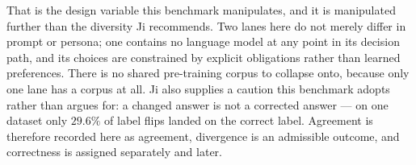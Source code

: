 That is the design variable this benchmark manipulates, and it is manipulated further than the diversity Ji recommends. Two lanes here do not merely differ in prompt or persona; one contains no language model at any point in its decision path, and its choices are constrained by explicit obligations rather than learned preferences. There is no shared pre-training corpus to collapse onto, because only one lane has a corpus at all. Ji also supplies a caution this benchmark adopts rather than argues for: a changed answer is not a corrected answer --- on one dataset only $29.6\%$ of label flips landed on the correct label. Agreement is therefore recorded here as agreement, divergence is an admissible outcome, and correctness is assigned separately and later.


